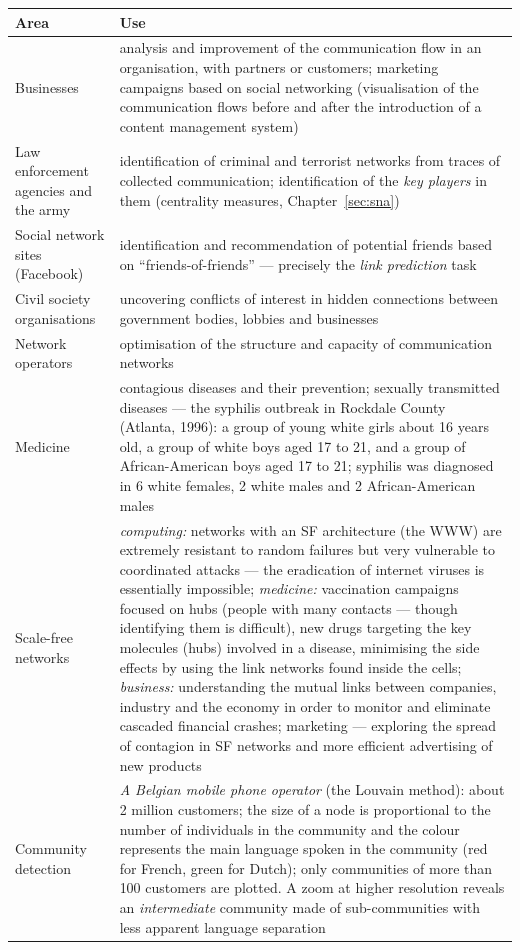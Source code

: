 \documentclass[11pt,a4paper]{article}
\theoremstyle{definition}
\providecommand{\uv}[1]{``#1''}
\begin{document}
\begin{center}
\small
\begin{tabular}{@{}p{3.7cm}p{11.2cm}@{}}
\toprule
\textbf{Area} & \textbf{Use} \\
\midrule
Businesses & analysis and improvement of the communication flow in an organisation, with partners or
  customers; marketing campaigns based on social networking (visualisation of the communication flows
  before and after the introduction of a content management system) \\
Law enforcement agencies and the army & identification of criminal and terrorist networks from traces
  of collected communication; identification of the \emph{key players} in them (centrality measures,
  Chapter~\ref{sec:sna}) \\
Social network sites (Facebook) & identification and recommendation of potential friends based on
  \uv{friends-of-friends} --- precisely the \emph{link prediction} task \\
Civil society organisations & uncovering conflicts of interest in hidden connections between
  government bodies, lobbies and businesses \\
Network operators & optimisation of the structure and capacity of communication networks \\
Medicine & contagious diseases and their prevention; sexually transmitted diseases --- the syphilis
  outbreak in Rockdale County (Atlanta, 1996): a group of young white girls about 16 years old, a
  group of white boys aged 17 to 21, and a group of African-American boys aged 17 to 21; syphilis was
  diagnosed in 6 white females, 2 white males and 2 African-American males \\
Scale-free networks & \emph{computing:} networks with an SF architecture (the WWW) are extremely
  resistant to random failures but very vulnerable to coordinated attacks --- the eradication of
  internet viruses is essentially impossible; \emph{medicine:} vaccination campaigns focused on hubs
  (people with many contacts --- though identifying them is difficult), new drugs targeting the key
  molecules (hubs) involved in a disease, minimising the side effects by using the link networks found
  inside the cells; \emph{business:} understanding the mutual links between companies, industry and
  the economy in order to monitor and eliminate cascaded financial crashes; marketing --- exploring
  the spread of contagion in SF networks and more efficient advertising of new products \\
Community detection & \emph{A Belgian mobile phone operator} (the Louvain method): about 2 million
  customers; the size of a node is proportional to the number of individuals in the community and the
  colour represents the main language spoken in the community (red for French, green for Dutch); only
  communities of more than 100 customers are plotted. A zoom at higher resolution reveals an
  \emph{intermediate} community made of sub-communities with less apparent language separation \\
\bottomrule
\end{tabular}
\end{center}
\end{document}
